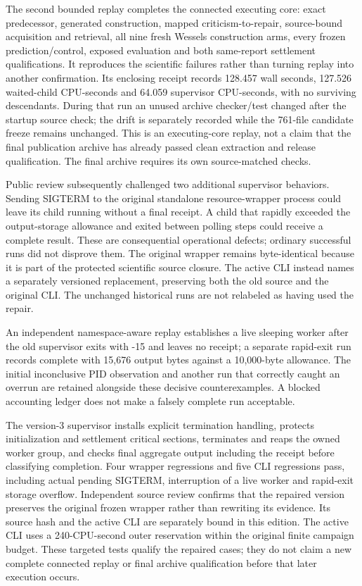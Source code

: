 \documentclass[
  10pt,
]{article}
\begin{document}
The second bounded replay completes the connected executing core: exact
predecessor, generated construction, mapped criticism-to-repair,
source-bound acquisition and retrieval, all nine fresh Wessels
construction arms, every frozen prediction/control, exposed evaluation
and both same-report settlement qualifications. It reproduces the
scientific failures rather than turning replay into another
confirmation. Its enclosing receipt records 128.457 wall seconds,
127.526 waited-child CPU-seconds and 64.059 supervisor CPU-seconds, with
no surviving descendants. During that run an unused archive checker/test
changed after the startup source check; the drift is separately recorded
while the 761-file candidate freeze remains unchanged. This is an
executing-core replay, not a claim that the final publication archive
has already passed clean extraction and release qualification. The final
archive requires its own source-matched checks.

Public review subsequently challenged two additional supervisor
behaviors. Sending SIGTERM to the original standalone resource-wrapper
process could leave its child running without a final receipt. A child
that rapidly exceeded the output-storage allowance and exited between
polling steps could receive a complete result. These are consequential
operational defects; ordinary successful runs did not disprove them. The
original wrapper remains byte-identical because it is part of the
protected scientific source closure. The active CLI instead names a
separately versioned replacement, preserving both the old source and the
original CLI. The unchanged historical runs are not relabeled as having
used the repair.

An independent namespace-aware replay establishes a live sleeping worker
after the old supervisor exits with -15 and leaves no receipt; a
separate rapid-exit run records complete with 15,676 output bytes
against a 10,000-byte allowance. The initial inconclusive PID
observation and another run that correctly caught an overrun are
retained alongside these decisive counterexamples. A blocked accounting
ledger does not make a falsely complete run acceptable.

The version-3 supervisor installs explicit termination handling,
protects initialization and settlement critical sections, terminates and
reaps the owned worker group, and checks final aggregate output
including the receipt before classifying completion. Four wrapper
regressions and five CLI regressions pass, including actual pending
SIGTERM, interruption of a live worker and rapid-exit storage overflow.
Independent source review confirms that the repaired version preserves
the original frozen wrapper rather than rewriting its evidence. Its
source hash and the active CLI are separately bound in this edition. The
active CLI uses a 240-CPU-second outer reservation within the original
finite campaign budget. These targeted tests qualify the repaired cases;
they do not claim a new complete connected replay or final archive
qualification before that later execution occurs.
\end{document}
